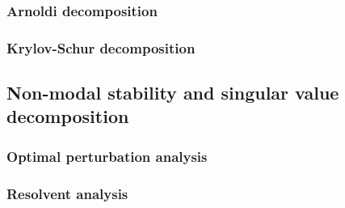     \subsubsection{Arnoldi decomposition}

    \subsubsection{Krylov-Schur decomposition}





  \subsection{Non-modal stability and singular value decomposition}

    \subsubsection{Optimal perturbation analysis}

    \subsubsection{Resolvent analysis}

